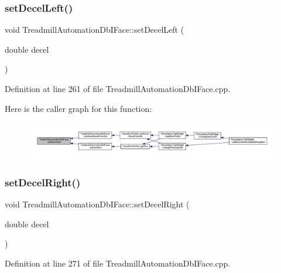 \subsubsection{\texorpdfstring{set\+Decel\+Left()}{setDecelLeft()}}
{\footnotesize\ttfamily void Treadmill\+Automation\+Db\+I\+Face\+::set\+Decel\+Left (\begin{DoxyParamCaption}\item[{double}]{decel }\end{DoxyParamCaption})}



Definition at line 261 of file Treadmill\+Automation\+Db\+I\+Face.\+cpp.

Here is the caller graph for this function\+:
\nopagebreak
\begin{figure}[H]
\begin{center}
\leavevmode
\includegraphics[width=350pt]{class_treadmill_automation_db_i_face_a8d7f60d12325634c978ea98075feb924_icgraph}
\end{center}
\end{figure}
\mbox{\label{class_treadmill_automation_db_i_face_a048ad2ac754cb27e929bf9c8a0c7ab21}} 
\subsubsection{\texorpdfstring{set\+Decel\+Right()}{setDecelRight()}}
{\footnotesize\ttfamily void Treadmill\+Automation\+Db\+I\+Face\+::set\+Decel\+Right (\begin{DoxyParamCaption}\item[{double}]{decel }\end{DoxyParamCaption})}



Definition at line 271 of file Treadmill\+Automation\+Db\+I\+Face.\+cpp.

